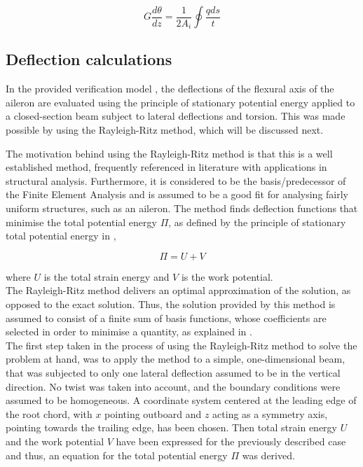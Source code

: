 \begin{equation}
\label{Gdtheta}
    G \frac{d \theta}{d z}=\frac{1}{2 A_{i}} \oint \frac{q d s}{t}
\end{equation}
\subsection{Deflection calculations}
\label{subsec:deflection_calculations}
In the provided verification model \cite{Verification_model_description}, the deflections of the flexural axis of the aileron are evaluated using the principle of stationary potential energy applied to a closed-section beam subject to lateral deflections and torsion. This was made possible by using the Rayleigh-Ritz method, which will be discussed next.

\noindent The motivation behind using the Rayleigh-Ritz method is that this is a well established method, frequently referenced in literature with applications in structural analysis. Furthermore, it is considered to be the basis/predecessor of the Finite Element Analysis and is assumed to be a good fit for analysing fairly uniform structures, such as an aileron. The method finds deflection functions that minimise the total potential energy $\Pi$, as defined by the principle of stationary total potential energy in ,

\begin{equation}
\label{eq:total_potential_energy}
    \Pi= U + V
\end{equation}

\noindent where $U$ is the total strain energy and $V$ is the work potential.\\

\noindent The Rayleigh-Ritz method delivers an optimal approximation of the solution, as opposed to the exact solution. Thus, the solution provided by this method is assumed to consist of a finite sum of basis functions, whose coefficients are selected in order to minimise a quantity, as explained in \cite{Verification_model_description}. \\

\noindent The first step taken in the process of using the Rayleigh-Ritz method to solve the problem at hand, was to apply the method to a simple, one-dimensional beam, that was subjected to only one lateral deflection assumed to be in the vertical direction. No twist was taken into account, and the boundary conditions were assumed to be homogeneous. A coordinate system centered at the leading edge of the root chord, with $x$ pointing outboard and $z$ acting as a symmetry axis, pointing towards the trailing edge, has been chosen. Then total strain energy $U$ and the work potential $V$ have been expressed for the previously described case and thus, an equation for the total potential energy $\Pi$ was derived. \\

